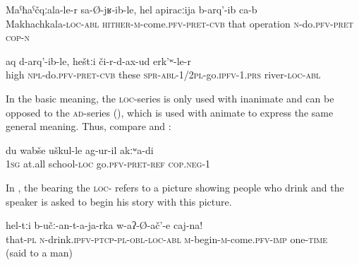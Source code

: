 \begin{exe}
	\ex	\label{ex:He came back from Makhachkala and had the operation}
	\gll	Maˁħaˁčqːala-le-r	sa-Ø-jʁ-ib-le,	hel	apiracːija	b-arq'-ib ca-b\\
		Makhachkala-\textsc{loc}-\textsc{abl}	\textsc{hither-m}-come.\textsc{pfv}-\textsc{pret}-\textsc{cvb} that operation	\textsc{n}-do.\textsc{pfv}-\textsc{pret} \textsc{cop-n}\\
	\glt	{}

	\ex	\label{ex:We take up (the trousers) and go across the river}
	\gll	aq	d-arq'-ib-le,	heštːi	či-r-d-ax-ud	erk'ʷ-le-r\\
		high	\textsc{npl}-do.\textsc{pfv}-\textsc{pret}-\textsc{cvb}	these	\textsc{spr}-\textsc{abl}-1/2\textsc{pl}-go.\textsc{ipfv}-1.\textsc{prs}	river-\textsc{loc}-\textsc{abl}\\
	\glt	{}
\end{exe}


In the basic meaning, the \textsc{loc}-series is only used with inanimate  and can be opposed to the \textsc{ad}-series (), which is used with animate  to express the same general meaning. Thus, compare  and :
%
\begin{exe}
	\ex	\label{ex:I did not go to school at all}
	\gll	du	wabše	uškul-le	ag-ur-il	akːʷa-di \\
		1\textsc{sg}	at.all	school-\textsc{loc}	go.\textsc{pfv}-\textsc{pret}-\textsc{ref}	\textsc{cop.neg}-1\\
	\glt	{}
\end{exe}

In , the  bearing the \textsc{loc-} refers to a picture showing people who drink and the speaker is asked to begin his story with this picture.
%
\begin{exe}
	\ex	\label{ex:First begin with these who drink}
	\gll	hel-tːi	b-učː-an-t-a-ja-rka	w-aʔ-Ø-ač'-e	caj-na! \\
		that-\textsc{pl}	\textsc{n}-drink.\textsc{ipfv}-\textsc{ptcp}-\textsc{pl}-\textsc{obl}-\textsc{loc}-\textsc{abl}	\textsc{m}-begin-\textsc{m}-come.\textsc{pfv}-\textsc{imp} one-\textsc{time}\\
	\glt	{} (said to a man)
\end{exe}

